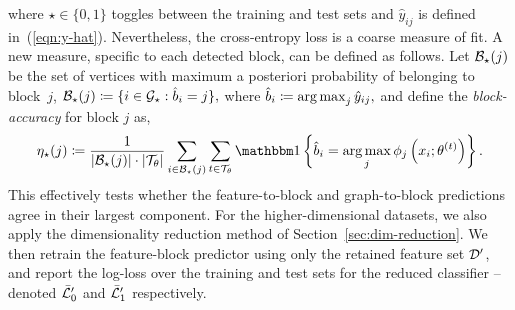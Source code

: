 %
where $\star \in \{0, 1\}$ toggles between the training and test sets
and $\hat{y}_{ij}$ is defined in~(\ref{eqn:y-hat}).
%
Nevertheless, the cross-entropy loss is a coarse measure of fit. 
A new measure, specific to each detected block,
can be defined as follows. Let
$\mathcal{B}_\star(j)$ 
be the set of vertices with maximum a posteriori probability of belonging 
to block~$j$,
$
	\mathcal{B}_\star(j) \coloneqq \{i \in \mathcal{G}_\star : \hat{b}_i = j\},
$
where
$ 
	\hat{b}_i \coloneqq \operatorname*{arg\,max}_j \hat{y}_{ij},
$
and
define the {\em block-accuracy} for block $j$ as,
%
\begin{equation}
	\eta_\star(j) \coloneqq \frac{1}{|\Bcal_\star (j)| \cdot 
	|\Tcal_\theta| } 
	\sum_{i \in \Bcal_\star (j)}  \sum_{t \in \Tcal_\theta}
	\one \left\{\hat{b}_i = \argmax_j \phi_j \left( x_i; \theta^{(t)} \right) \right\}.
	\label{eqn:accuracy}
\end{equation}
%
This effectively tests whether the feature-to-block and 
graph-to-block predictions agree in their largest component.
For the higher-dimensional datasets, we also apply the 
dimensionality reduction method 
of Section~\ref{sec:dim-reduction}.  
We then retrain the feature-block predictor using only the retained 
feature set $\mathcal{D}'$, and report the log-loss over the training and 
test sets for the reduced classifier -- 
denoted $\bar{\mathcal{L}}_0'$ and $\bar{\mathcal{L}}_1'$ respectively. 



